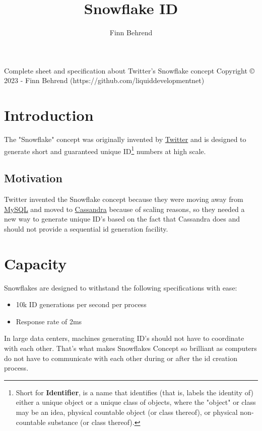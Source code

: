 \documentclass{article}
\title{\textbf{Snowflake ID}}
\author{Finn Behrend}
\begin{document}
\begin{titlingpage}
\maketitle
\begin{center}
\vspace{50px}
Complete sheet and specification about Twitter's Snowflake concept
\vfill
\footnotesize{Copyright \copyright{} 2023 - Finn Behrend (https://github.com/liquiddevelopmentnet)}
\end{center}
\end{titlingpage}

\tableofcontents

\pagebreak


\section{Introduction}
The "Snowflake" concept was originally invented by \href{https://twitter.com}{Twitter} and is designed to generate short and guaranteed unique ID\footnote{Short for \textbf{Identifier},  is a name that identifies (that is, labels the identity of) either a unique object or a unique class of objects, where the "object" or class may be an idea, physical countable object (or class thereof), or physical non-countable substance (or class thereof).} numbers at high scale.


\subsection{Motivation}
Twitter invented the Snowflake concept because they were moving away from \href{https://en.wikipedia.org/wiki/MySQL}{MySQL} and moved to \href{https://en.wikipedia.org/wiki/Cassandra}{Cassandra} because of scaling reasons, so they needed a new way to generate unique ID's based on the fact that Cassandra does and should not provide a sequential id generation facility.


\section{Capacity}
Snowflakes are designed to withstand the following specifications with ease:
\begin{itemize}
\item 10k ID generations per second per process
\item Response rate of 2ms
\end{itemize}
In large data centers, machines generating ID's should not have to coordinate with each other. That's what makes Snowflakes Concept so brilliant as computers do not have to communicate with each other during or after the id creation process.
\end{document}
